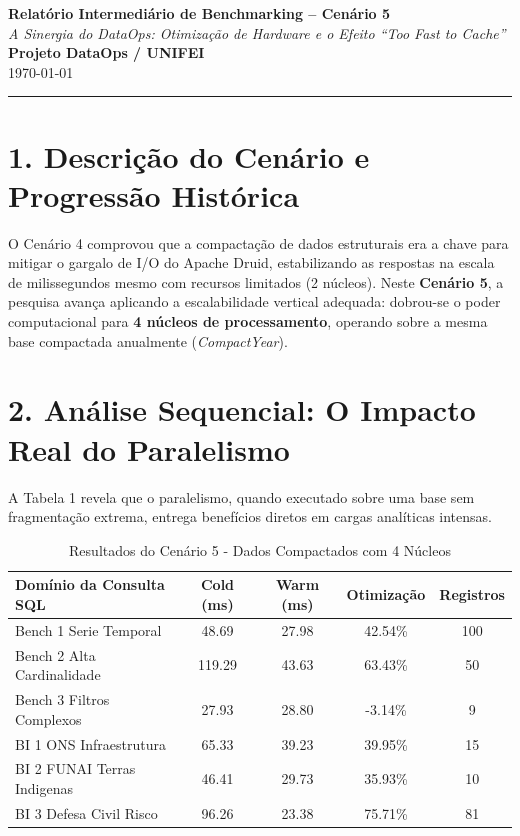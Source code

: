 \documentclass[12pt, a4paper]{article}
\begin{document}
\begin{center}
    \Large\textbf{Relatório Intermediário de Benchmarking -- Cenário 5} \\[0.2cm]
    \large\textit{A Sinergia do DataOps: Otimização de Hardware e o Efeito ``Too Fast to Cache''} \\[0.5cm]
    \normalsize\textbf{Projeto DataOps / UNIFEI} \\
    \small{\today}
\end{center}

\vspace{0.5cm}
\noindent\rule{\textwidth}{1pt}

\section*{1. Descrição do Cenário e Progressão Histórica}
O Cenário 4 comprovou que a compactação de dados estruturais era a chave para mitigar o gargalo de I/O do Apache Druid, estabilizando as respostas na escala de milissegundos mesmo com recursos limitados (2 núcleos). Neste \textbf{Cenário 5}, a pesquisa avança aplicando a escalabilidade vertical adequada: dobrou-se o poder computacional para \textbf{4 núcleos de processamento}, operando sobre a mesma base compactada anualmente (\textit{CompactYear}).

\section*{2. Análise Sequencial: O Impacto Real do Paralelismo}
A Tabela 1 revela que o paralelismo, quando executado sobre uma base sem fragmentação extrema, entrega benefícios diretos em cargas analíticas intensas.

\begin{table}[H]
\centering
\caption{Resultados do Cenário 5 - Dados Compactados com 4 Núcleos}
\vspace{0.2cm}
\begin{tabular}{@{}lcccc@{}}
\toprule
\textbf{Domínio da Consulta SQL} & \textbf{Cold (ms)} & \textbf{Warm (ms)} & \textbf{Otimização} & \textbf{Registros} \\
\midrule
    Bench 1 Serie Temporal & 48.69 & 27.98 & 42.54\% & 100 \\
    Bench 2 Alta Cardinalidade & 119.29 & 43.63 & 63.43\% & 50 \\
    Bench 3 Filtros Complexos & 27.93 & 28.80 & -3.14\% & 9 \\
    BI 1 ONS Infraestrutura & 65.33 & 39.23 & 39.95\% & 15 \\
    BI 2 FUNAI Terras Indigenas & 46.41 & 29.73 & 35.93\% & 10 \\
    BI 3 Defesa Civil Risco & 96.26 & 23.38 & 75.71\% & 81 \\

\bottomrule
\end{tabular}
\end{table}
\end{document}
